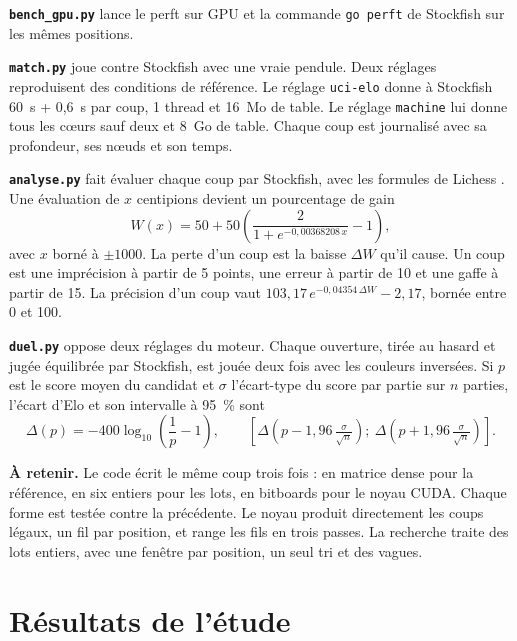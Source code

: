 \documentclass[11pt,a4paper]{article}
\newcommand{\code}[1]{\texttt{#1}}
\theoremstyle{plain}
\begin{document}
\textbf{\code{bench\_gpu.py}} lance le perft sur GPU et la commande \code{go perft} de Stockfish
sur les mêmes positions.

\textbf{\code{match.py}} joue contre Stockfish avec une vraie pendule. Deux réglages reproduisent
des conditions de référence. Le réglage \code{uci-elo} donne à Stockfish 60~s + 0,6~s par coup,
1 thread et 16~Mo de table. Le réglage \code{machine} lui donne tous les cœurs sauf deux et 8~Go
de table. Chaque coup est journalisé avec sa profondeur, ses nœuds et son temps.

\textbf{\code{analyse.py}} fait évaluer chaque coup par Stockfish, avec les formules de Lichess
\cite{lichess}. Une évaluation de $x$ centipions devient un pourcentage de gain
\[ W(x) = 50 + 50\left(\frac{2}{1 + e^{-0{,}00368208\,x}} - 1\right), \]
avec $x$ borné à $\pm1000$. La perte d'un coup est la baisse $\Delta W$ qu'il cause. Un coup est
une imprécision à partir de 5 points, une erreur à partir de 10 et une gaffe à partir de 15. La
précision d'un coup vaut $103{,}17\,e^{-0{,}04354\,\Delta W} - 2{,}17$, bornée entre 0 et 100.

\textbf{\code{duel.py}} oppose deux réglages du moteur. Chaque ouverture, tirée au hasard et
jugée équilibrée par Stockfish, est jouée deux fois avec les couleurs inversées. Si $p$ est le
score moyen du candidat et $\sigma$ l'écart-type du score par partie sur $n$ parties, l'écart
d'Elo et son intervalle à 95~\% sont
\[ \Delta(p) = -400 \log_{10}\!\left(\frac1p - 1\right),\qquad
\left[\Delta\!\left(p - 1{,}96\,\tfrac{\sigma}{\sqrt n}\right) ;\
\Delta\!\left(p + 1{,}96\,\tfrac{\sigma}{\sqrt n}\right)\right]. \]

\begin{note}
\textbf{À retenir.} Le code écrit le même coup trois fois : en matrice dense pour la référence,
en six entiers pour les lots, en bitboards pour le noyau CUDA. Chaque forme est testée contre la
précédente. Le noyau produit directement les coups légaux, un fil par position, et range les fils
en trois passes. La recherche traite des lots entiers, avec une fenêtre par position, un seul tri
et des vagues.
\end{note}

\clearpage
\part{Résultats de l'étude}
\end{document}
